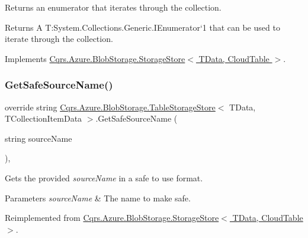 Returns an enumerator that iterates through the collection. 

\begin{DoxyReturn}{Returns}
A T\+:\+System.\+Collections.\+Generic.\+I\+Enumerator`1 that can be used to iterate through the collection. 
\end{DoxyReturn}


Implements \hyperlink{classCqrs_1_1Azure_1_1BlobStorage_1_1StorageStore_a2eb689ea51d586309b79d6cbac05b616_a2eb689ea51d586309b79d6cbac05b616}{Cqrs.\+Azure.\+Blob\+Storage.\+Storage\+Store$<$ T\+Data, Cloud\+Table $>$}.

\mbox{\label{classCqrs_1_1Azure_1_1BlobStorage_1_1TableStorageStore_a7b9e49aa8017ff3c55b184b956a150d0_a7b9e49aa8017ff3c55b184b956a150d0}} 
\subsubsection{\texorpdfstring{Get\+Safe\+Source\+Name()}{GetSafeSourceName()}}
{\footnotesize\ttfamily override string \hyperlink{classCqrs_1_1Azure_1_1BlobStorage_1_1TableStorageStore}{Cqrs.\+Azure.\+Blob\+Storage.\+Table\+Storage\+Store}$<$ T\+Data, T\+Collection\+Item\+Data $>$.Get\+Safe\+Source\+Name (\begin{DoxyParamCaption}\item[{string}]{source\+Name }\end{DoxyParamCaption})\hspace{0.3cm}{\ttfamily [protected]}, {\ttfamily [virtual]}}



Gets the provided {\itshape source\+Name}  in a safe to use format. 


\begin{DoxyParams}{Parameters}
{\em source\+Name} & The name to make safe.\\
\hline
\end{DoxyParams}


Reimplemented from \hyperlink{classCqrs_1_1Azure_1_1BlobStorage_1_1StorageStore_a3ed119d808d9b29e99b1c6c983831482_a3ed119d808d9b29e99b1c6c983831482}{Cqrs.\+Azure.\+Blob\+Storage.\+Storage\+Store$<$ T\+Data, Cloud\+Table $>$}.

